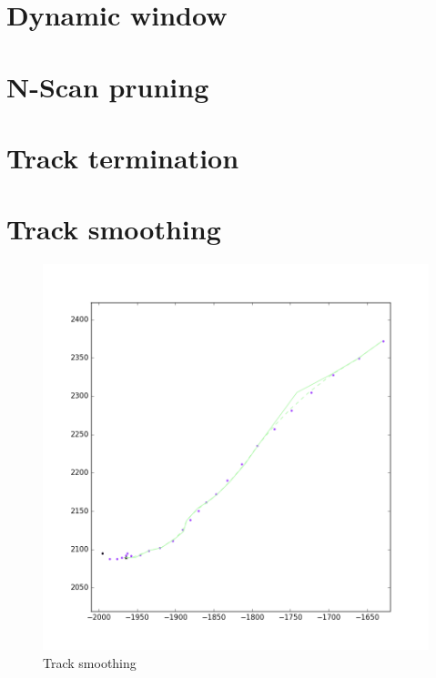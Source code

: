 
\section{Dynamic window}

\section{N-Scan pruning}

\section{Track termination}

\section{Track smoothing}
\begin{figure}[H]
\centering
\includegraphics[width = .9\textwidth]{Figures/track_smoothing.png}
\caption{Track smoothing}\label{fig:track_smoothing}
\end{figure}